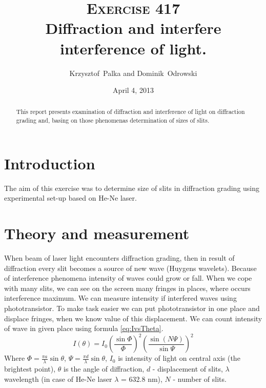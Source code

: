 \documentclass[a4paper,12pt]{article}
\author{Krzysztof~Palka and Dominik~Odrowski}
\date{April 4, 2013}
\title{\textsc{Exercise} 417 \\ Diffraction and interfere interference of light.}
\begin{document}
\maketitle

\begin{abstract}
This report presents examination of diffraction and interference of light on diffraction grading and, basing on those phenomenas determination of sizes of slits.  
\end{abstract}

\section{Introduction}
The aim of this exercise was to determine size of slits in diffraction grading using experimental set-up based on He-Ne laser.

\section{Theory and measurement}
When beam of laser light encounters diffraction grading, then in result of diffraction every slit becomes a source of new wave (Huygens wavelets). Because of interference phenomena intensity of waves could grow or fall. When we cope with many slits, we can see on the screen many fringes in places, where occurs interference maximum. We can measure intensity if interfered waves using phototransistor. To make task easier we can put phototransistor in one place and displace fringes, when we know value of this displacement. We can count intensity of wave in given place using formula \ref{eq:IvsTheta}.
\begin{equation}
    I(\theta) = I_0\left(\frac{\sin\Phi}{\Phi}\right)^2 \left(\frac{\sin(N\Psi)}{\sin\Psi}\right)^2 \label{eq:IvsTheta}
\end{equation}
Where $\Phi = \frac{\pi a}{\lambda} \sin \theta$, $\Psi = \frac{\pi d}{\lambda} \sin \theta$, $I_0$ is intensity of light on central axis (the brightest point), $\theta$ is the angle of diffraction, $d$ - displacement of slits, $\lambda$ wavelength (in case of He-Ne laser $\lambda$ = 632.8 nm), $N$ - number of slits.
\end{document}

